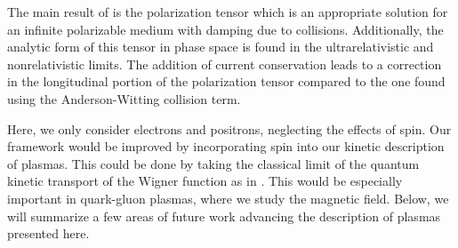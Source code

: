 The main result of \cite{Formanek:2021blc} is the polarization tensor  which is an appropriate solution for an infinite polarizable medium with damping due to collisions. Additionally, the analytic form of this tensor in phase space is found in the ultrarelativistic and nonrelativistic limits. The addition of current conservation leads to a correction in the longitudinal portion of the polarization tensor compared to the one found using the Anderson-Witting collision term.

Here, we only consider electrons and positrons, neglecting the effects of spin. Our framework would be improved by incorporating spin into our kinetic description of plasmas. This could be done by taking the classical limit of the quantum kinetic transport of the Wigner function as in \cite{Hurst:2014svf}. This would be especially important in quark-gluon plasmas, where we study the magnetic field. Below, we will summarize a few areas of future work advancing the description of plasmas presented here. 

